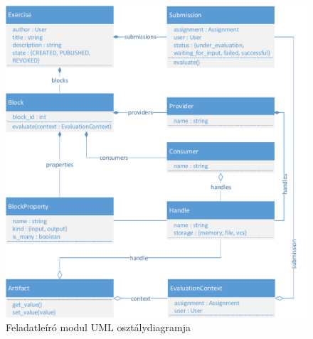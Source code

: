 \begin{figure}[h]
    \centering
    \includegraphics[width=\textwidth]{figures/exercise-uml-cd}
    \smallskip
    \caption{Feladatleíró modul UML osztálydiagramja}
    \label{figure:exercise-uml-cd}
\end{figure}

